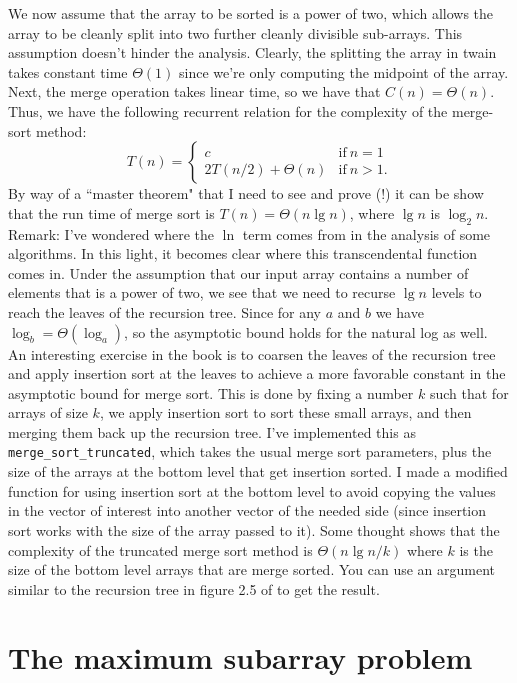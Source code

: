 \documentclass[12pt,english]{article}
\begin{document}
We now assume that the array to be sorted is a power of two, which allows the array to be cleanly split into two further cleanly divisible sub-arrays.  This assumption doesn't hinder the analysis.  Clearly, the splitting the array in twain takes constant time $\Theta(1)$ since we're only computing the midpoint of the array.  Next, the merge operation takes linear time, so we have that $C(n) = \Theta(n)$.  Thus, we have the following recurrent relation for the complexity of the merge-sort method:
$$
T(n) = 
\left\{
\begin{array}{cc}
c				& 	\text{if}~n=1 \\
2T(n/2) + \Theta(n)	&	\text{if}~n>1.
\end{array}
\right.
$$
By way of a ``master theorem" that I need to see and prove (!) it can be show that the run time of merge sort is $T(n) = \Theta(n \lg n)$, where $\lg n$ is $\log_2 n$.  Remark: I've wondered where the $\ln$ term comes from in the analysis of some algorithms.  In this light, it becomes clear where this transcendental function comes in.   Under the assumption that our input array contains a number of elements that is a power of two, we see that we need to recurse $\lg n$ levels to reach the leaves of the recursion tree.  Since for any $a$ and $b$ we have $\log_b = \Theta(\log_a)$, so the asymptotic bound holds for the natural log as well.  \\

An interesting exercise in the book is to coarsen the leaves of the recursion tree and apply insertion sort at the leaves to achieve a more favorable constant in the asymptotic bound for merge sort.  This is done by fixing a number $k$ such that for arrays of size $k$, we apply insertion sort to sort these small arrays, and then merging them back up the recursion tree.  I've implemented this as \texttt{merge\_sort\_truncated}, which takes the usual merge sort parameters, plus the size of the arrays at the bottom level that get insertion sorted.  I made a modified function for using insertion sort at the bottom level to avoid copying the values in the vector of interest into another vector of the needed side (since insertion sort works with the size of the array passed to it).  Some thought shows that the complexity of the truncated merge sort method is $\Theta(n\lg n/k)$ where $k$ is the size of the bottom level arrays that are merge sorted.  You can use an argument similar to the recursion tree in figure 2.5 of \cite{CoStRiLe:2001} to get the result.

\section{The maximum subarray problem}

{}

\end{document}
